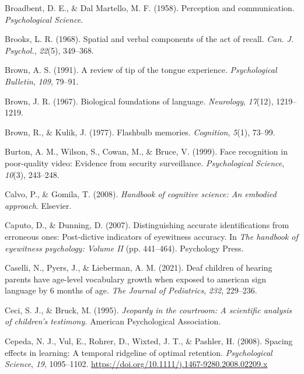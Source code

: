 \documentclass[
]{krantz}
\newlength{\cslhangindent}
\newlength{\cslentryspacingunit} %
\newenvironment{CSLReferences}[2] %
 {%
  \setlength{\parindent}{0pt}
  \ifodd #1
  \let\oldpar\par
  \def\par{\hangindent=\cslhangindent\oldpar}
  \fi
  \setlength{\parskip}{#2\cslentryspacingunit}
 }%
 {}
\begin{document}
\begin{CSLReferences}{1}{0}
\leavevmode{}%
Broadbent, D. E., \& Dal Martello, M. F. (1958). Perception and communication. \emph{Psychological Science}.

\leavevmode{}%
Brooks, L. R. (1968). Spatial and verbal components of the act of recall. \emph{Can. J. Psychol.}, \emph{22}(5), 349--368.

\leavevmode{}%
Brown, A. S. (1991). A review of tip of the tongue experience. \emph{Psychological Bulletin}, \emph{109}, 79--91.

\leavevmode{}%
Brown, J. R. (1967). Biological foundations of language. \emph{Neurology}, \emph{17}(12), 1219--1219.

\leavevmode{}%
Brown, R., \& Kulik, J. (1977). Flashbulb memories. \emph{Cognition}, \emph{5}(1), 73--99.

\leavevmode{}%
Burton, A. M., Wilson, S., Cowan, M., \& Bruce, V. (1999). Face recognition in poor-quality video: Evidence from security surveillance. \emph{Psychological Science}, \emph{10}(3), 243--248.

\leavevmode{}%
Calvo, P., \& Gomila, T. (2008). \emph{Handbook of cognitive science: An embodied approach}. Elsevier.

\leavevmode{}%
Caputo, D., \& Dunning, D. (2007). Distinguishing accurate identifications from erroneous ones: Post-dictive indicators of eyewitness accuracy. In \emph{The handbook of eyewitness psychology: Volume II} (pp. 441--464). Psychology Press.

\leavevmode{}%
Caselli, N., Pyers, J., \& Lieberman, A. M. (2021). Deaf children of hearing parents have age-level vocabulary growth when exposed to american sign language by 6 months of age. \emph{The Journal of Pediatrics}, \emph{232}, 229--236.

\leavevmode{}%
Ceci, S. J., \& Bruck, M. (1995). \emph{Jeopardy in the courtroom: A scientific analysis of children's testimony.} American Psychological Association.

\leavevmode{}%
Cepeda, N. J., Vul, E., Rohrer, D., Wixted, J. T., \& Pashler, H. (2008). Spacing effects in learning: A temporal ridgeline of optimal retention. \emph{Psychological Science}, \emph{19}, 1095--1102. \url{https://doi.org/10.1111/j.1467-9280.2008.02209.x}


\end{CSLReferences}
\end{document}
